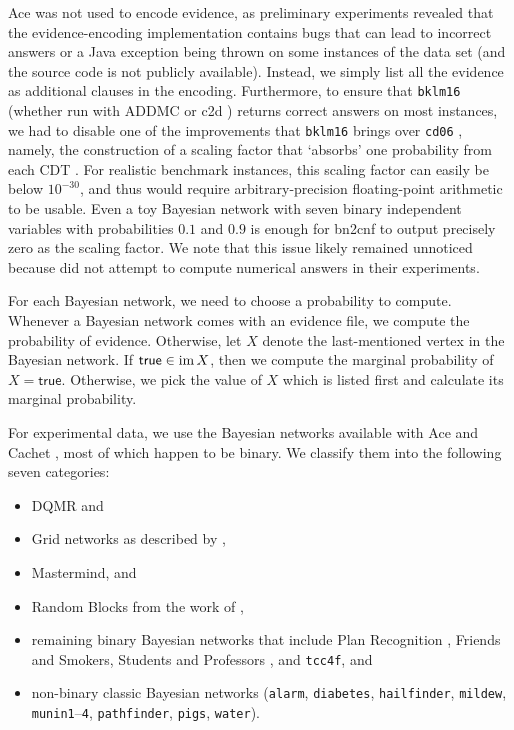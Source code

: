 \textsf{Ace} was not used to encode evidence, as preliminary experiments
revealed that the evidence-encoding implementation contains bugs that can lead
to incorrect answers or a Java exception being thrown on some instances of the
data set (and the source code is not publicly available). Instead, we simply
list all the evidence as additional clauses in the encoding. Furthermore, to
ensure that \texttt{bklm16} \citep{DBLP:conf/ecai/BartKLM16} (whether run with
\textsf{ADDMC} \citep{DBLP:conf/aaai/DudekPV20} or \textsf{c2d}
\citep{DBLP:conf/ecai/Darwiche04}) returns correct answers on most instances, we
had to disable one of the improvements that \texttt{bklm16} brings over
\texttt{cd06} \citep{DBLP:conf/sat/ChaviraD06}, namely, the construction of a
scaling factor that `absorbs' one probability from each CDT
\citep{DBLP:conf/ecai/BartKLM16}. For realistic benchmark instances, this
scaling factor can easily be below $10^{-30}$, and thus would require
arbitrary-precision floating-point arithmetic to be usable. Even a toy Bayesian
network with seven binary independent variables with probabilities $0.1$ and
$0.9$ is enough for \textsf{bn2cnf} to output precisely zero as the scaling
factor. We note that this issue likely remained unnoticed because
\citet{DBLP:conf/ecai/BartKLM16} did not attempt to compute numerical answers in
their experiments.

For each Bayesian network, we need to choose a probability to compute. Whenever
a Bayesian network comes with an evidence file, we compute the probability of
evidence. Otherwise, let $X$ denote the last-mentioned vertex in the Bayesian
network. If $\mathsf{true} \in \operatorname{im} X$, then we compute the marginal probability
of $X = \mathsf{true}$. Otherwise, we pick the value of $X$ which is listed
first and calculate its marginal probability.

For experimental data, we use the Bayesian networks available with \textsf{Ace}
and \textsf{Cachet} \citep{DBLP:conf/sat/SangBBKP04}, most of which happen to be
binary. We classify them into the following seven categories:
\begin{itemize}
\item DQMR and
\item Grid networks as described by \citet{DBLP:conf/aaai/SangBK05},
\item Mastermind, and
\item Random Blocks from the work of \citet{DBLP:journals/ijar/ChaviraDJ06},
\item remaining binary Bayesian networks that include Plan Recognition
  \citep{DBLP:conf/aaai/SangBK05}, Friends and Smokers, Students and Professors
  \citep{DBLP:journals/ijar/ChaviraDJ06}, and \texttt{tcc4f}, and
\item non-binary classic Bayesian networks (\texttt{alarm}, \texttt{diabetes},
  \texttt{hailfinder}, \texttt{mildew}, \texttt{munin1}--\texttt{4},
  \texttt{pathfinder}, \texttt{pigs}, \texttt{water}).
\end{itemize}

